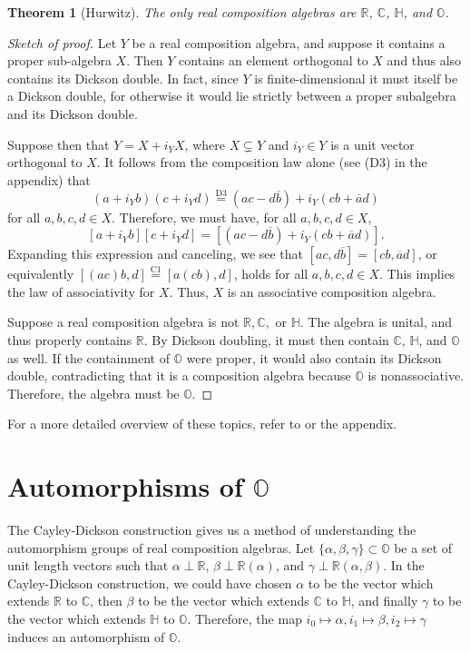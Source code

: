 \documentclass[10pt]{amsart}
\newcommand{\R}{\mathbb{R}}
\newcommand{\C}{\mathbb{C}}
\renewcommand{\H}{\mathbb{H}}
\renewcommand{\O}{\mathbb{O}}
\renewcommand{\bar}{\overline}
\newcommand{\norm}[1]{\left[#1\right]}
\newtheorem{thm}{Theorem}
\begin{document}
\begin{thm}[Hurwitz]
\normalfont
The only real composition algebras are $\R$, $\C$, $\H$, and $\O$.
\end{thm}

\begin{proof}[Sketch of proof]
Let $Y$ be a real composition algebra, and suppose it contains a proper sub-algebra $X$.  Then $Y$ contains an element orthogonal to $X$ and thus also contains its Dickson double.  In fact, since $Y$ is finite-dimensional it must itself be a Dickson double, for otherwise it would lie strictly between a proper subalgebra and its Dickson double.

Suppose then that $Y = X + i_Y X$, where $X \subsetneq Y$ and $i_Y \in Y$ is a unit vector orthogonal to $X$.  It follows from the composition law alone (see (D3) in the appendix) that
$$
(a+i_Yb)(c+i_Yd) \overset{\text{D3}}{=} (ac-d\bar{b}) + i_Y(cb+\bar{a}d)
$$
for all $a,b,c,d \in X$.  Therefore, we must have, for all $a,b,c,d \in X$,
$$
\norm{a+i_Yb}\norm{c+i_Yd} = \norm{(ac-d\bar{b}) + i_Y(cb+\bar{a}d)}.
$$
Expanding this expression and canceling, we see that $[ac,d\bar{b}] = [cb,\bar{a}d]$, or equivalently $[(ac)b,d] \overset{\text{C1}}{=} [a(cb),d]$, holds for all $a,b,c,d \in X$.  This implies the law of associativity for $X$.  Thus, $X$ is an associative composition algebra.

Suppose a real composition algebra is not $\R, \C,$ or $\H$.  The algebra is unital, and thus properly contains $\R$.  By Dickson doubling, it must then contain $\C$, $\H$, and $\O$ as well.  If the containment of $\O$ were proper, it would also contain its Dickson double, contradicting that it is a composition algebra because $\O$ is nonassociative.  Therefore, the algebra must be $\O$.
\end{proof}

\noindent For a more detailed overview of these topics, refer to \cite{Co03} or the appendix.

\section{Automorphisms of $\O$}

The Cayley-Dickson construction gives us a method of understanding the automorphism groups of real composition algebras.  Let $\{\alpha, \beta, \gamma\} \subset \O$ be a set of unit length vectors such that $\alpha \perp \R$, $\beta \perp \R(\alpha)$, and $\gamma \perp \R(\alpha,\beta)$.  In the Cayley-Dickson construction, we could have chosen $\alpha$ to be the vector which extends $\R$ to $\C$, then $\beta$ to be the vector which extends $\C$ to $\H$, and finally $\gamma$ to be the vector which extends $\H$ to $\O$.  Therefore, the map $i_0 \mapsto \alpha, i_1 \mapsto \beta, i_2 \mapsto \gamma$ induces an automorphism of $\O$. 
\end{document}

